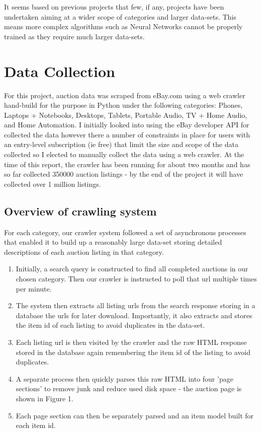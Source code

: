\documentclass[12pt]{article}
\begin{document}
It seems based on previous projects that few, if any, projects have been undertaken aiming at a wider scope of categories and larger data-sets. This means more complex algorithms such as Neural Networks cannot be properly trained as they require much larger data-sets.
\newpage


\section{Data Collection}

For this project, auction data was scraped from eBay.com using a web crawler hand-build for the purpose in Python under the following categories: Phones, Laptops + Notebooks, Desktops, Tablets, Portable Audio, TV + Home Audio, and Home Automation. 
I initially looked into using the eBay developer API for collected the data however there a number of constraints in place for users with an entry-level subscription (ie free) that limit the size and scope of the data collected so I elected to manually  collect the data using a web crawler. 
At the time of this report, the crawler has been running for about two months and has so far collected 350000 auction listings - by the end of the project it will have collected over 1 million listings.

\subsection{Overview of crawling system}
For each category, our crawler system followed a set of asynchronous processes that enabled it to build up a reasonably large data-set storing detailed descriptions of each auction listing in that category.

\begin{enumerate}
\item Initially, a search query is constructed to find all completed auctions in our chosen category. Then our crawler is instructed to poll that url multiple times per minute. 
\item The system then extracts all listing urls from the search response storing in a database the urls for later download. Importantly, it also extracts and stores the item id of each listing to avoid duplicates in the data-set.
\item Each listing url is then visited by the crawler and the raw HTML response stored in the database again remembering the item id of the listing to avoid duplicates.
\item A separate process then quickly parses this raw HTML into four 'page sections' to remove junk and reduce used disk space - the auction page is shown in Figure 1.
\item Each page section can then be separately parsed and an item model built for each item id.
\end{enumerate}
\end{document}
